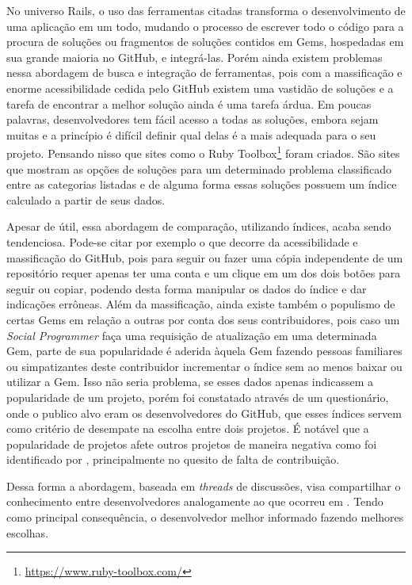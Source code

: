 No universo Rails, o uso das ferramentas citadas transforma o desenvolvimento de uma aplicação em um todo, mudando o processo de escrever todo o código para a procura de soluções ou fragmentos de soluções contidos em Gems, hospedadas em sua grande maioria no GitHub, e integrá-las. Porém ainda existem problemas nessa abordagem de busca e integração de ferramentas, pois com a massificação e enorme acessibilidade cedida pelo GitHub existem uma vastidão de soluções e a tarefa de encontrar a melhor solução ainda é uma tarefa árdua. Em poucas palavras, desenvolvedores tem fácil acesso a todas as soluções, embora sejam muitas e a princípio é difícil definir qual delas é a mais adequada para o seu projeto. Pensando nisso que sites como o Ruby Toolbox\footnote{\url{https://www.ruby-toolbox.com/}} foram criados. São sites que mostram as opções de soluções para um determinado problema classificado entre as categorias listadas e de alguma forma essas soluções possuem um índice calculado a partir de seus dados.

Apesar de útil, essa abordagem de comparação, utilizando índices, acaba sendo tendenciosa. Pode-se citar por exemplo o que decorre da acessibilidade e massificação do GitHub, pois para seguir ou fazer uma cópia independente de um repositório requer apenas ter uma conta e um clique em um dos dois botões para seguir ou copiar, podendo desta forma manipular os dados do índice e dar indicações errôneas. Além da massificação, ainda existe também o populismo de certas Gems em relação a outras por conta dos seus contribuidores, pois caso um \textit{Social Programmer}\cite{Singer:2013:MAS:2441776.2441791} faça uma requisição de atualização em uma determinada Gem, parte de sua popularidade é aderida àquela Gem fazendo pessoas familiares ou simpatizantes deste contribuidor incrementar o índice sem ao menos baixar ou utilizar a Gem. Isso não seria problema, se esses dados apenas indicassem a popularidade de um projeto, porém foi constatado através de um questionário, onde o publico alvo eram os desenvolvedores do GitHub, que esses índices servem como critério de desempate na escolha entre dois projetos. É notável que a popularidade de projetos afete outros projetos de maneira negativa como foi identificado por \cite{michlmayr:quality_problems}, principalmente no quesito de falta de contribuição. 

Dessa forma a abordagem, baseada em \textit{threads} de discussões, visa compartilhar o conhecimento entre desenvolvedores analogamente ao que ocorreu em \cite{1997PhDT.......258H}. Tendo como principal consequência, o desenvolvedor melhor informado fazendo melhores escolhas.

